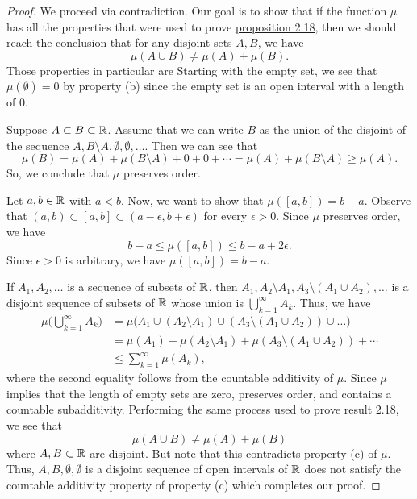 \documentclass[11pt,a4paper]{book}
\begin{document}
\begin{proof}
We proceed via contradiction. Our goal is to show that if the function \( \mu  \) has all the properties that were used to prove {\hyperref[Nonadditivity of Outer Measure]{proposition 2.18}}, then we should reach the conclusion that for any disjoint sets \( A, B  \), we have 
\[  \mu(A \cup B) \neq \mu(A) + \mu(B). \] 
Those properties in particular are {\hyperref[Outer Measure Preserves Order]{}}  
Starting with the empty set, we see that \( \mu(\emptyset) = 0  \) by property (b) since the empty set is an open interval with a length of \( 0  \).  

Suppose \( A \subset B \subset \mathbb{R}  \). Assume that we can write \( B  \) as the union of the disjoint of the sequence \( A, B \setminus A, \emptyset, \emptyset, \dots  \). Then we can see that
\[  \mu(B) = \mu(A) + \mu ( B \setminus A ) + 0 + 0 + \cdots = \mu(A) + \mu(B \setminus A ) \geq \mu(A).   \]
So, we conclude that \( \mu  \) preserves order.  

Let \( a,b \in \mathbb{R}  \) with \( a < b  \). Now, we want to show that \( \mu([a,b]) = b - a  \). Observe that \( (a,b) \subset [a,b] \subset (a - \epsilon, b + \epsilon ) \) for every \( \epsilon > 0  \). Since \( \mu  \) preserves order, we have   
\[  b - a \leq \mu([a,b]) \leq b - a + 2 \epsilon. \]
Since \( \epsilon > 0  \) is arbitrary, we have \( \mu([a,b]) = b - a  \). 

If \( {A}_{1}, {A}_{2}, \dots  \) is a sequence of subsets of \( \mathbb{R}  \), then \( {A}_{1}, {A}_{2} \setminus {A}_{1}, {A}_{3} \setminus ({A}_{1} \cup {A}_{2}), \dots  \) is a disjoint sequence of subsets of \( \mathbb{R}  \) whose union is \( \bigcup_{ k=1  }^{ \infty  }  {A}_{k } \). Thus, we have
\begin{align*}
    \mu \Big(  \bigcup_{ k=1  }^{ \infty  }  {A}_{k } \Big) &= \mu \Big(  {A}_{1} \cup ( {A}_{2} \setminus {A}_{1}) \cup ({A}_{3} \setminus ({A}_{1} \cup {A}_{2})) \cup \dots   \Big) \\
                                                            &= \mu({A}_{1}) + \mu({A}_{2} \setminus {A}_{1}) + \mu({A}_{3} \setminus ({A}_{1} \cup {A}_{2})) + \cdots \\  
                                                            &\leq \sum_{ k=1  }^{ \infty  } \mu({A}_{k }),
\end{align*}
where the second equality follows from the countable additivity of \( \mu \). 
Since \( \mu  \) implies that the length of empty sets are zero, preserves order, and contains a countable subadditivity. Performing the same process used to prove result 2.18, we see that  
\[  \mu(A \cup B) \neq \mu(A) + \mu(B) \]
where \( A,B \subset \mathbb{R}  \) are disjoint. But note that this contradicts property (c) of \( \mu  \). Thus, \( A,B, \emptyset, \emptyset   \) is a disjoint sequence of open intervals of \( \mathbb{R}  \) does not satisfy the countable additivity property of property (c) which completes our proof.     
\end{proof}
\end{document}
